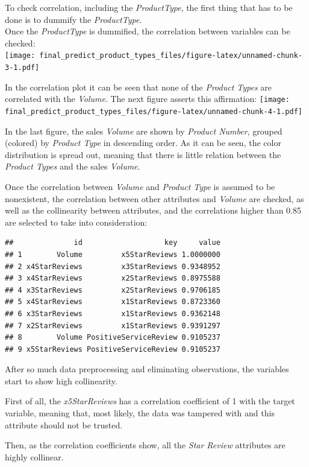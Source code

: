 \documentclass[]{article}
\begin{document}
To check correlation, including the \emph{ProductType}, the first thing
that has to be done is to dummify the \emph{ProductType}.\\
Once the \emph{ProductType} is dummified, the correlation between
variables can be checked:\\
\texttt{[image: final\_predict\_product\_types\_files/figure-latex/unnamed-chunk-3-1.pdf]}

In the correlation plot it can be seen that none of the \emph{Product
Types} are correlated with the \emph{Volume}. The next figure asserts
this affirmation:
\texttt{[image: final\_predict\_product\_types\_files/figure-latex/unnamed-chunk-4-1.pdf]}

In the last figure, the sales \emph{Volume} are shown by \emph{Product
Number}, grouped (colored) by \emph{Product Type} in descending order.
As it can be seen, the color distribution is spread out, meaning that
there is little relation between the \emph{Product Types} and the sales
\emph{Volume}.

Once the correlation between \emph{Volume} and \emph{Product Type} is
assumed to be nonexistent, the correlation between other attributes and
\emph{Volume} are checked, as well as the collinearity between
attributes, and the correlations higher than 0.85 are selected to take
into consideration:

\begin{verbatim}
##              id                   key     value
## 1        Volume         x5StarReviews 1.0000000
## 2 x4StarReviews         x3StarReviews 0.9348952
## 3 x4StarReviews         x2StarReviews 0.8975588
## 4 x3StarReviews         x2StarReviews 0.9706185
## 5 x4StarReviews         x1StarReviews 0.8723360
## 6 x3StarReviews         x1StarReviews 0.9362148
## 7 x2StarReviews         x1StarReviews 0.9391297
## 8        Volume PositiveServiceReview 0.9105237
## 9 x5StarReviews PositiveServiceReview 0.9105237
\end{verbatim}

After so much data preprocessing and eliminating observations, the
variables start to show high collinearity.

First of all, the \emph{x5StarReviews} has a correlation coefficient of
1 with the target variable, meaning that, most likely, the data was
tampered with and this attribute should not be trusted.

Then, as the correlation coefficients show, all the \emph{Star Review}
attributes are highly collinear.
\end{document}
